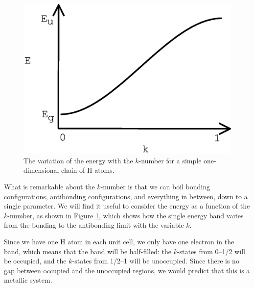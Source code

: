 \begin{figure}
\begin{center}
\includegraphics[scale=0.5]{1d-EvsK}
\caption{The variation of the energy with the $k$-number for a simple
one-dimensional chain of H atoms.}
\label{1d-EvsK}
\end{center}
\end{figure}

What is remarkable about the $k$-number is that we can boil bonding
configurations, antibonding configurations, and everything in between,
down to a single parameter. We will find it useful to consider the
energy as a function of the $k$-number, as shown in Figure
\ref{1d-EvsK}, which shows how the single energy band varies from the
bonding to the antibonding limit with the variable $k$. 

Since we have one H atom in each unit cell, we only have one electron
in the band, which means that the band will be half-filled: the
$k$-states from 0--1/2 will be occupied, and the $k$-states from
1/2--1 will be unoccupied. Since there is no gap between occupied and
the unoccupied regions, we would predict that this is a metallic
system.


